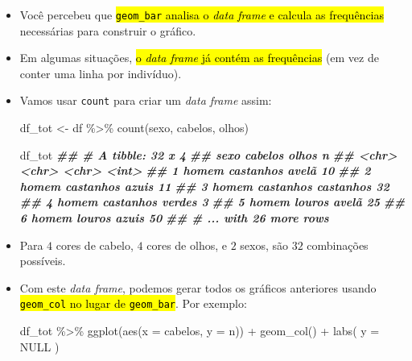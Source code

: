 \documentclass[
  11pt]{report}
\newenvironment{Shaded}{\begin{snugshade}}{\end{snugshade}}
\newcommand{\AttributeTok}[1]{\textcolor[rgb]{0.77,0.63,0.00}{#1}}
\newcommand{\ConstantTok}[1]{\textcolor[rgb]{0.00,0.00,0.00}{#1}}
\newcommand{\DocumentationTok}[1]{\textcolor[rgb]{0.56,0.35,0.01}{\textbf{\textit{#1}}}}
\newcommand{\FunctionTok}[1]{\textcolor[rgb]{0.00,0.00,0.00}{#1}}
\newcommand{\NormalTok}[1]{#1}
\newcommand{\OtherTok}[1]{\textcolor[rgb]{0.56,0.35,0.01}{#1}}
\newcommand{\SpecialCharTok}[1]{\textcolor[rgb]{0.00,0.00,0.00}{#1}}
\renewenvironment{Shaded}{
    \begin{mdframed}[%
      roundcorner=2pt,%
      innerleftmargin=5pt,%
      innerrightmargin=5pt,%
      topline=true,%
      leftline=true,%
      rightline=true,%
      bottomline=true,%
      linewidth=0.5pt,%
      linecolor=black!20,%
      backgroundcolor=black!2,%
      skipabove=2ex,%
      skipbelow=2.5ex%
    ]%
  }
  {
    \end{mdframed}
  }
\begin{document}
\begin{itemize}
\item
  Você percebeu que {\hl{{\mbox{\texttt{geom\_bar}}} analisa o \emph{data frame} e calcula as frequências}} necessárias para construir o gráfico.
\item
  Em algumas situações, {\hl{o \emph{data frame} já contém as frequências}} (em vez de conter uma linha por indivíduo).
\item
  Vamos usar \texttt{count} para criar um \emph{data frame} assim:

\begin{Shaded}
\begin{Highlighting}[]
\NormalTok{df\_tot }\OtherTok{\textless{}{-}}\NormalTok{ df }\SpecialCharTok{\%\textgreater{}\%} 
  \FunctionTok{count}\NormalTok{(sexo, cabelos, olhos)}

\NormalTok{df\_tot}
\DocumentationTok{\#\# \# A tibble: 32 x 4}
\DocumentationTok{\#\#   sexo  cabelos   olhos         n}
\DocumentationTok{\#\#   \textless{}chr\textgreater{} \textless{}chr\textgreater{}     \textless{}chr\textgreater{}     \textless{}int\textgreater{}}
\DocumentationTok{\#\# 1 homem castanhos avelã        10}
\DocumentationTok{\#\# 2 homem castanhos azuis        11}
\DocumentationTok{\#\# 3 homem castanhos castanhos    32}
\DocumentationTok{\#\# 4 homem castanhos verdes        3}
\DocumentationTok{\#\# 5 homem louros    avelã        25}
\DocumentationTok{\#\# 6 homem louros    azuis        50}
\DocumentationTok{\#\# \# ... with 26 more rows}
\end{Highlighting}
\end{Shaded}
\item
  Para $4$ cores de cabelo, $4$ cores de olhos, e $2$ sexos, são $32$ combinações possíveis.
\item
  Com este \emph{data frame}, podemos gerar todos os gráficos anteriores usando {\hl{{\mbox{\texttt{geom\_col}}} no lugar de {\mbox{\texttt{geom\_bar}}}}}. Por exemplo:

\begin{Shaded}
\begin{Highlighting}[]
\NormalTok{df\_tot }\SpecialCharTok{\%\textgreater{}\%} 
  \FunctionTok{ggplot}\NormalTok{(}\FunctionTok{aes}\NormalTok{(}\AttributeTok{x =}\NormalTok{ cabelos, }\AttributeTok{y =}\NormalTok{ n)) }\SpecialCharTok{+}
    \FunctionTok{geom\_col}\NormalTok{() }\SpecialCharTok{+}
    \FunctionTok{labs}\NormalTok{(}
      \AttributeTok{y =} \ConstantTok{NULL}
\NormalTok{    )}
\end{Highlighting}
\end{Shaded}


\end{itemize}
\end{document}
